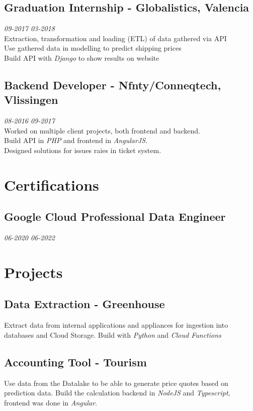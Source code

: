 \documentclass{article}
\begin{document}
\subsection{Graduation Internship - Globalistics, Valencia} \hfill {\em 09-2017 03-2018} \\
Extraction, transformation and loading (ETL) of data gathered via API \\
Use gathered data in modelling to predict shipping prices \\
Build API with \emph{Django} to show results on website \\


\subsection{Backend Developer - Nfnty/Conneqtech, Vlissingen} \hfill {\em 08-2016 09-2017} \\
Worked on multiple client projects, both frontend and backend. \\
Build API in \emph{PHP} and frontend in \emph{AngularJS}. \\
Designed solutions for issues raies in ticket system. \\

\section{Certifications}
\subsection{Google Cloud Professional Data Engineer}\hfill {\em 06-2020 06-2022} \\

\section{Projects}
\subsection{Data Extraction - Greenhouse}
Extract data from internal applications and appliances for ingestion into databases and Cloud Storage. Build with \emph{Python} and \emph{Cloud Functions}

\subsection{Accounting Tool - Tourism}
Use data from the Datalake to be able to generate price quotes based on prediction data. Build the calculation backend in \emph{NodeJS} and \emph{Typescript}, frontend was done in \emph{Angular}.
\end{document}
